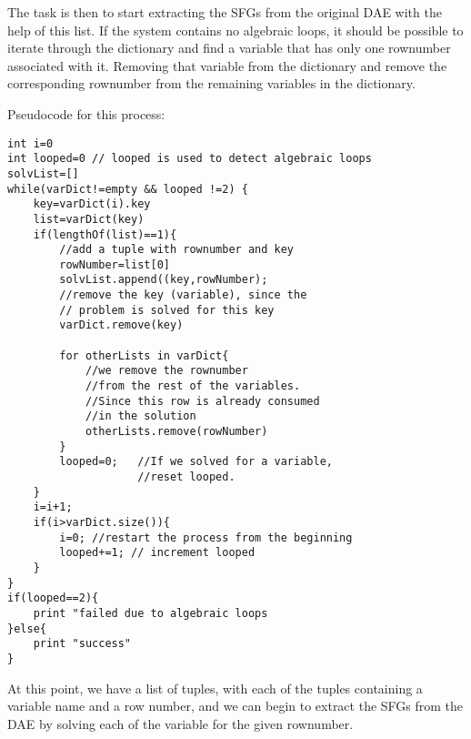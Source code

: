 The task is then to start extracting the SFGs from the original DAE with the help of this list. If the system contains no algebraic loops, it should be possible to iterate through the dictionary and find a variable that has only one rownumber associated with it. Removing that variable from the dictionary and remove the corresponding rownumber from the remaining variables in the dictionary.

Pseudocode for this process:
\begin{lstlisting}
int i=0
int looped=0 // looped is used to detect algebraic loops
solvList=[]
while(varDict!=empty && looped !=2) {
	key=varDict(i).key
	list=varDict(key)
	if(lengthOf(list)==1){
		//add a tuple with rownumber and key
		rowNumber=list[0]
		solvList.append((key,rowNumber);
		//remove the key (variable), since the
		// problem is solved for this key
		varDict.remove(key)
		
		for otherLists in varDict{
			//we remove the rownumber 
			//from the rest of the variables.
			//Since this row is already consumed
			//in the solution
			otherLists.remove(rowNumber)
		}
		looped=0; 	//If we solved for a variable, 
					//reset looped.
	}
	i=i+1;
	if(i>varDict.size()){
		i=0; //restart the process from the beginning
		looped+=1; // increment looped 	
	}			
}
if(looped==2){
	print "failed due to algebraic loops
}else{
	print "success"
}

\end{lstlisting}

At this point, we have a list of tuples, with each of the tuples containing a variable name and a row number, and we can begin to extract the SFGs from the DAE by solving each of the variable for the given rownumber.